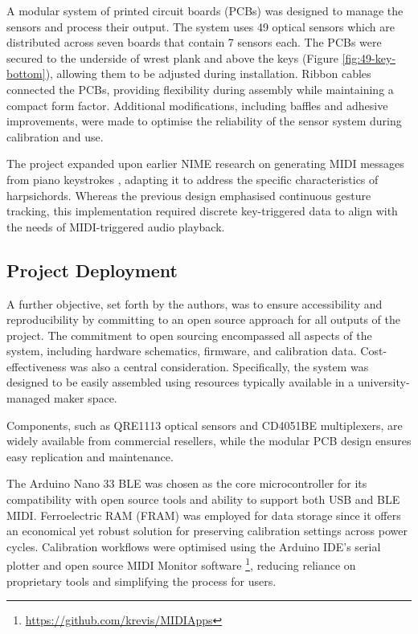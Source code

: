 A modular system of printed circuit boards (PCBs) was designed to manage the sensors and process their output. The system uses 49 optical sensors which are distributed across seven boards that contain 7 sensors each. The PCBs were secured to the underside of wrest plank and above the keys (Figure \ref{fig:49-key-bottom}), allowing them to be adjusted during installation. Ribbon cables connected the PCBs, providing flexibility during assembly while maintaining a compact form factor. Additional modifications, including baffles and adhesive improvements, were made to optimise the reliability of the sensor system during calibration and use.

The project expanded upon earlier NIME research on generating MIDI messages from piano keystrokes \cite{McPherson2013}, adapting it to address the specific characteristics of harpsichords. Whereas the previous design emphasised continuous gesture tracking, this implementation required discrete key-triggered data to align with the needs of MIDI-triggered audio playback. 

\subsection{Project Deployment}

A further objective, set forth by the authors, was to ensure accessibility and reproducibility by committing to an open source approach for all outputs of the project. The commitment to open sourcing encompassed all aspects of the system, including hardware schematics, firmware, and calibration data. Cost-effectiveness was also a central consideration. 
Specifically, the system was designed to be easily assembled using resources typically available in a university-managed maker space.


Components, such as QRE1113 optical sensors and CD4051BE multiplexers, are widely available from commercial resellers, while the modular PCB design ensures easy replication and maintenance.

The Arduino Nano 33 BLE was chosen as the core microcontroller for its compatibility with open source tools and ability to support both USB and BLE MIDI. Ferroelectric RAM (FRAM) was employed for data storage since it offers an economical yet robust solution for preserving calibration settings across power cycles. Calibration workflows were optimised using the Arduino IDE’s serial plotter and open source MIDI Monitor software \footnote{\url{https://github.com/krevis/MIDIApps}}, reducing reliance on proprietary tools and simplifying the process for users. 

